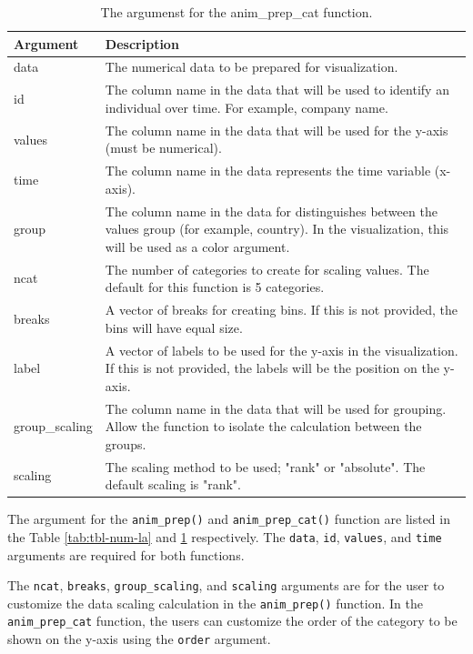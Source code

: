 \begin{table}

\caption{\label{tab:tbl-cat-la}The argumenst for the anim\_prep\_cat function.}
\centering
\begin{tabular}[t]{l|>{\raggedright\arraybackslash}p{30em}}
\hline
Argument & Description\\
\hline
data & The numerical data to be prepared for visualization.\\
\hline
id & The column name in the data that will be used to identify an individual over time. For example, company name.\\
\hline
values & The column name in the data that will be used for the y-axis (must be numerical).\\
\hline
time & The column name in the data represents the time variable (x-axis).\\
\hline
group & The column name in the data for distinguishes between the values group (for example, country). In the visualization, this will be used as a color argument.\\
\hline
ncat & The number of categories to create for scaling values. The default for this function is 5 categories.\\
\hline
breaks & A vector of breaks for creating bins. If this is not provided, the bins will have equal size.\\
\hline
label & A vector of labels to be used for the y-axis in the visualization. If this is not provided, the labels will be the position on the y-axis.\\
\hline
group\_scaling & The column name in the data that will be used for grouping. Allow the function to isolate the calculation between the groups.\\
\hline
scaling & The scaling method to be used; "rank" or "absolute". The default scaling is "rank".\\
\hline
\end{tabular}
\end{table}

The argument for the \texttt{anim\_prep()} and \texttt{anim\_prep\_cat()} function are listed in the Table \ref{tab:tbl-num-la} and \ref{tab:tbl-cat-la} respectively. The \texttt{data}, \texttt{id}, \texttt{values}, and \texttt{time} arguments are required for both functions.

The \texttt{ncat}, \texttt{breaks}, \texttt{group\_scaling}, and \texttt{scaling} arguments are for the user to customize the data scaling calculation in the \texttt{anim\_prep()} function. In the \texttt{anim\_prep\_cat} function, the users can customize the order of the category to be shown on the y-axis using the \texttt{order} argument.

